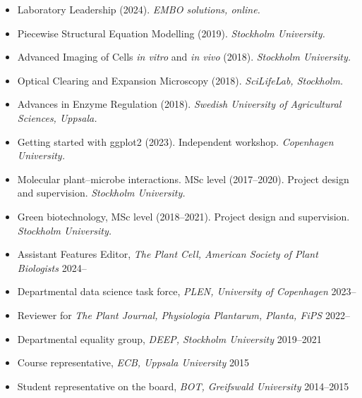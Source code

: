 \documentclass[11pt]{article}
\begin{document}
\vspace{-0.175cm}
\begin{itemize}[label={},itemindent=-9pt,leftmargin=24pt]
	\itemsep-0.1cm
	\item Laboratory Leadership (2024). \textit{EMBO solutions, online.}
	\item Piecewise Structural Equation Modelling (2019). \textit{Stockholm University.}
	\item Advanced Imaging of Cells \textit{in vitro} and \textit{in vivo} (2018). \textit{Stockholm University.} 
	\item Optical Clearing and Expansion Microscopy (2018). \textit{SciLifeLab, Stockholm.} 	
	\item Advances in Enzyme Regulation (2018). \textit{Swedish University of Agricultural Sciences, Uppsala.} 
\end{itemize}
\vspace{0.3cm}

\vspace{-0.175cm}
\begin{itemize}[label={},itemindent=-9pt,leftmargin=24pt]
	\itemsep-0.1cm
	\item Getting started with ggplot2 (2023). Independent workshop. \textit{Copenhagen University.}
	\item Molecular plant--microbe interactions. MSc level (2017--2020). Project design and supervision. \textit{Stockholm University.} 	
	\item Green biotechnology, MSc level (2018--2021). Project design and supervision. \textit{Stockholm University.} 
\end{itemize}
\vspace{0.3cm}

\vspace{-0.175cm}
\begin{itemize}[label={},itemindent=-9pt,leftmargin=24pt]
	\itemsep-0.1cm
	\item Assistant Features Editor, \textit{The Plant Cell, American Society of Plant Biologists} \hfill 2024--
	\item Departmental data science task force, \textit{PLEN, University of Copenhagen} \hfill 2023--
	\item Reviewer for \textit{The Plant Journal, Physiologia Plantarum, Planta, FiPS}  \hfill 2022--
	\item Departmental equality group, \textit{DEEP, Stockholm University}  \hfill 2019--2021
	\item Course representative, \textit{ECB, Uppsala University} \hfill 2015
	\item Student representative on the board, \textit{BOT, Greifswald University} \hfill 2014--2015
\end{itemize}
\end{document}
